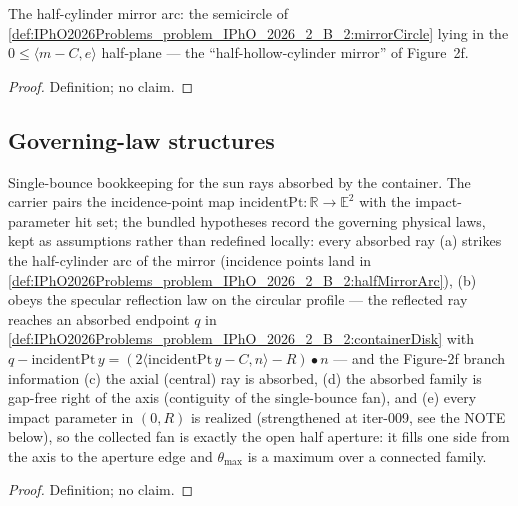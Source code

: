 \begin{definition}
\label{def:IPhO2026Problems_problem_IPhO_2026_2_B_2:halfMirrorArc}
The half-cylinder mirror arc: the semicircle of
\cref{def:IPhO2026Problems_problem_IPhO_2026_2_B_2:mirrorCircle} lying in
the $0 \le \langle m - C, e\rangle$ half-plane --- the
``half-hollow-cylinder mirror'' of Figure~2f.
\end{definition}
\begin{proof}
Definition; no claim.
\end{proof}

\subsection*{Governing-law structures}

\begin{definition}
\label{def:IPhO2026Problems_problem_IPhO_2026_2_B_2:AbsorbedRays}
Single-bounce bookkeeping for the sun rays absorbed by the container.  The
carrier pairs the incidence-point map $\mathrm{incidentPt} : \mathbb{R} \to
\mathbb{E}^2$ with the impact-parameter hit set; the bundled hypotheses
record the governing physical laws, kept as assumptions rather than
redefined locally: every absorbed ray (a) strikes the half-cylinder arc of
the mirror (incidence points land in
\cref{def:IPhO2026Problems_problem_IPhO_2026_2_B_2:halfMirrorArc}), (b)
obeys the specular reflection law on the circular profile --- the reflected
ray reaches an absorbed endpoint $q$ in
\cref{def:IPhO2026Problems_problem_IPhO_2026_2_B_2:containerDisk} with
$q - \mathrm{incidentPt}\,y = (2\langle \mathrm{incidentPt}\,y - C, n\rangle - R) \bullet n$ ---
and the Figure-2f branch information (c) the axial (central) ray is
absorbed, (d) the absorbed family is gap-free right of the axis
(contiguity of the single-bounce fan), and (e) every impact parameter in
$(0, R)$ is realized (strengthened at iter-009, see the NOTE below), so
the collected fan is exactly the open half aperture: it fills one side
from the axis to the aperture edge and $\theta_{\max}$ is a maximum over
a connected family.
\end{definition}
\begin{proof}
Definition; no claim.
\end{proof}

